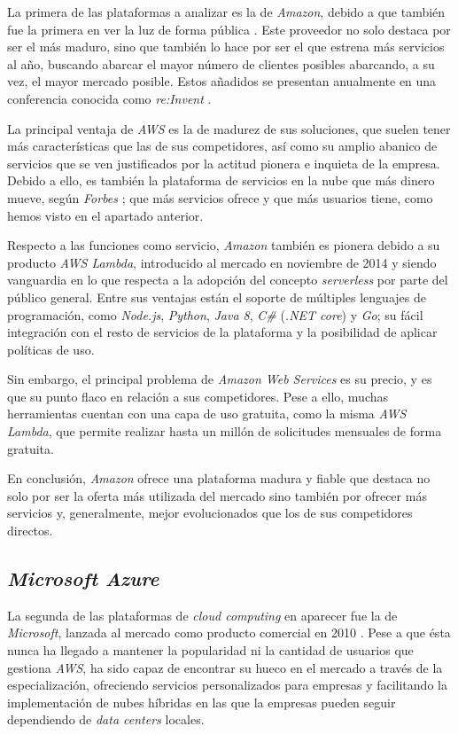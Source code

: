 \documentclass[11pt,spanish,listoffigures]{tfgetsinf}
\begin{document}
La primera de las plataformas a analizar es la de \textit{Amazon}, debido a que también fue la primera en ver la luz de forma pública \cite{aws-announcement}. Este proveedor no solo destaca por ser el más maduro, sino que también lo hace por ser el que estrena más servicios al año, buscando abarcar el mayor número de clientes posibles abarcando, a su vez, el mayor mercado posible. Estos añadidos se presentan anualmente en una conferencia conocida como \textit{re:Invent} \cite{reinvent}.

La principal ventaja de \textit{AWS} es la de madurez de sus soluciones, que suelen tener más características que las de sus competidores, así como su amplio abanico de servicios que se ven justificados por la actitud pionera e inquieta de la empresa. Debido a ello, es también la plataforma de servicios en la nube que más dinero mueve, según \textit{Forbes} \cite{forbes-aws}; que más servicios ofrece y que más usuarios tiene, como hemos visto en el apartado anterior.

Respecto a las funciones como servicio, \textit{Amazon} también es pionera debido a su producto \textit{AWS Lambda}, introducido al mercado en noviembre de 2014 y siendo vanguardia en lo que respecta a la adopción del concepto \textit{serverless} por parte del público general. Entre sus ventajas están el soporte de múltiples lenguajes de programación, como \textit{Node.js}, \textit{Python}, \textit{Java 8}, \textit{C\#} (\textit{.NET core}) y \textit{Go}; su fácil integración con el resto de servicios de la plataforma y la posibilidad de aplicar políticas de uso.

Sin embargo, el principal problema de \textit{Amazon Web Services} es su precio, y es que su punto flaco en relación a sus competidores. Pese a ello, muchas herramientas cuentan con una capa de uso gratuita, como la misma \textit{AWS Lambda}, que permite realizar hasta un millón de solicitudes mensuales de forma gratuita. 

En conclusión, \textit{Amazon} ofrece una plataforma madura y fiable que destaca no solo por ser la oferta más utilizada del mercado sino también por ofrecer más servicios y, generalmente, mejor evolucionados que los de sus competidores directos.

\subsection{\textit{Microsoft Azure}}
\label{sec:microsoft-azure}

La segunda de las plataformas de \textit{\gls{cloud computing}} en aparecer fue la de \textit{Microsoft}, lanzada al mercado como producto comercial en 2010 \cite{azure-announcement}. Pese a que ésta nunca ha llegado a mantener la popularidad ni la cantidad de usuarios que gestiona \textit{AWS}, ha sido capaz de encontrar su hueco en el mercado a través de la especialización, ofreciendo servicios personalizados para empresas y facilitando la implementación de nubes híbridas en las que la empresas pueden seguir dependiendo de \textit{data centers} locales.
\end{document}
